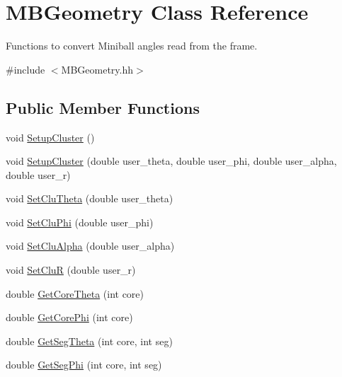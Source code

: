 \hypertarget{class_m_b_geometry}{}\section{M\+B\+Geometry Class Reference}
\label{class_m_b_geometry}


Functions to convert Miniball angles read from the frame.  




{\ttfamily \#include $<$M\+B\+Geometry.\+hh$>$}

\subsection*{Public Member Functions}
\begin{DoxyCompactItemize}
\item 
void \hyperlink{class_m_b_geometry_a4d98a38f0dc1ca6a4a73477dde5cdd8d}{Setup\+Cluster} ()
\item 
void \hyperlink{class_m_b_geometry_a93f157cebad3f63dbbefb5b08f3555af}{Setup\+Cluster} (double user\+\_\+theta, double user\+\_\+phi, double user\+\_\+alpha, double user\+\_\+r)
\item 
void \hyperlink{class_m_b_geometry_a9a2a8c9609141be92d7ba30e6087aa30}{Set\+Clu\+Theta} (double user\+\_\+theta)
\item 
void \hyperlink{class_m_b_geometry_a74142f84cf6317d52ae39c0e0ff8a87e}{Set\+Clu\+Phi} (double user\+\_\+phi)
\item 
void \hyperlink{class_m_b_geometry_a0d4868b0360a6e5534918a9813540015}{Set\+Clu\+Alpha} (double user\+\_\+alpha)
\item 
void \hyperlink{class_m_b_geometry_a292c4326421c78871667e91c3694ae35}{Set\+CluR} (double user\+\_\+r)
\item 
double \hyperlink{class_m_b_geometry_a42aa536f15017724812712b0f8a77c12}{Get\+Core\+Theta} (int core)
\item 
double \hyperlink{class_m_b_geometry_a39f685610ae0e68e547a46f8ef992599}{Get\+Core\+Phi} (int core)
\item 
double \hyperlink{class_m_b_geometry_a49cdf742a2902fc85f0b24dfffa554a8}{Get\+Seg\+Theta} (int core, int seg)
\item 
double \hyperlink{class_m_b_geometry_a575ddd6022d2d686a83ebce3195b6c50}{Get\+Seg\+Phi} (int core, int seg)
\item 
\mbox{\label{class_m_b_geometry_af4adfb858000405b21f79a6bf10c3c37}} 

\end{DoxyCompactItemize}
